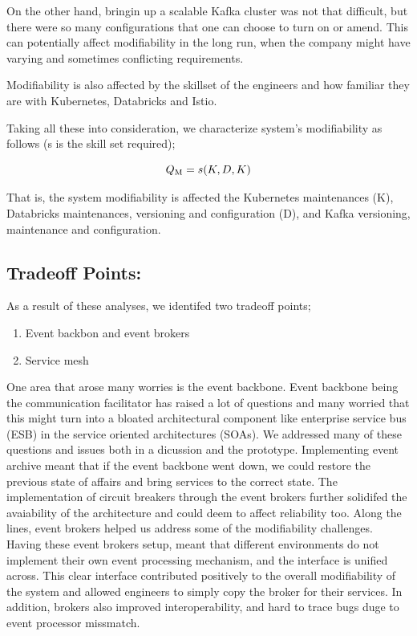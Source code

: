 \documentclass[review]{elsarticle}
\begin{document}
On the other hand, bringin up a scalable Kafka cluster was not that difficult, but there were so many configurations that one can choose to turn on or amend. This can potentially affect modifiability in the long run, when the company might have varying and sometimes conflicting requirements.

Modifiability is also affected by the skillset of the engineers and how familiar they are with Kubernetes, Databricks and Istio.

Taking all these into consideration, we characterize system's modifiability as follows (s is the skill set required);

\begin{equation}
    Q\textsubscript{M} = s(K, D, K)
\end{equation}

That is, the system modifiability is affected the Kubernetes maintenances (K), Databricks maintenances, versioning and configuration (D), and Kafka versioning, maintenance and configuration.

\subsection{Tradeoff Points:}

As a result of these analyses, we identifed two tradeoff points;

\begin{enumerate}
    \item Event backbon and event brokers
    \item Service mesh
\end{enumerate}

One area that arose many worries is the event backbone. Event backbone being the communication facilitator has raised a lot of questions and many worried that this might turn into a bloated architectural component like enterprise service bus (ESB) in the service oriented architectures (SOAs). We addressed many of these questions and issues both in a dicussion and the prototype. Implementing event archive meant that if the event backbone went down, we could restore the previous state of affairs and bring services to the correct state. The implementation of circuit breakers through the event brokers further solidifed the avaiability of the architecture and could deem to affect reliability too. Along the lines, event brokers helped us address some of the modifiability challenges. Having these event brokers setup, meant that different environments do not implement their own event processing mechanism, and the interface is unified across. This clear interface contributed positively to the overall modifiability of the system and allowed engineers to simply copy the broker for their services. In addition, brokers also improved interoperability, and hard to trace bugs duge to event processor missmatch.
\end{document}
